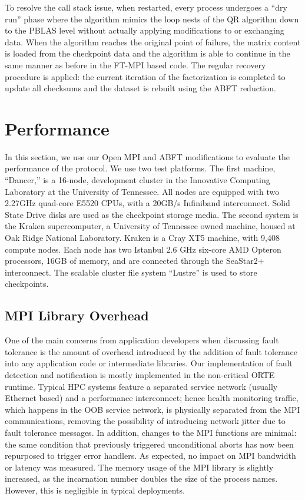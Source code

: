 To resolve the call stack issue, when restarted, every process undergoes a ``dry
run'' phase where the algorithm mimics the loop nests of the QR algorithm down
to the PBLAS level without actually applying modifications to or exchanging
data. When the algorithm reaches the original point of failure, the matrix content is
loaded from the checkpoint data and the algorithm is able to continue in the
same manner as before in the FT-MPI based code. The regular recovery procedure
is applied: the current iteration of the factorization is completed to update
all checksums and the dataset is rebuilt using the ABFT reduction.

\section{\cof Performance}\label{sect:cof:performance}

In this section, we use our Open MPI and ABFT modifications to evaluate the performance
of the \cof protocol. We use two test platforms. The first machine, ``Dancer,''
is a 16-node, development cluster in the Innovative Computing Laboratory at the 
University of Tennessee. All nodes are equipped with two 2.27GHz quad-core E5520
CPUs, with a 20GB/s Infiniband interconnect. Solid State Drive disks are used as
the checkpoint storage media. The second system is the Kraken supercomputer, a 
University of Tennessee owned machine, housed at Oak Ridge National Laboratory.
Kraken is a Cray XT5 machine, with 9,408 compute nodes. Each node has two
Istanbul 2.6 GHz six-core AMD Opteron processors, 16GB of memory, and are
connected through the SeaStar2+ interconnect. The scalable cluster file system
``Lustre'' is used to store checkpoints.

\subsection{MPI Library Overhead}\label{subsect:cof:performance:overhead}

One of the main concerns from application developers when discussing fault
tolerance is the amount of overhead introduced by the addition of fault
tolerance into any application code or intermediate libraries. Our
implementation of fault detection and notification is mostly implemented in the
non-critical ORTE runtime. Typical HPC systems feature a separated service
network (usually Ethernet based) and a performance interconnect; hence health
monitoring traffic, which happens in the OOB service network, is physically
separated from the MPI communications, removing the possibility of introducing
network jitter due to fault tolerance messages. In addition, changes to the MPI
functions are minimal: the same condition that previously triggered
unconditional aborts has now been repurposed to trigger error handlers. As
expected, no impact on MPI bandwidth or latency was measured.
The memory usage of the MPI library is slightly increased, as the incarnation
number doubles the size of the process names. However, this is negligible in
typical deployments.

